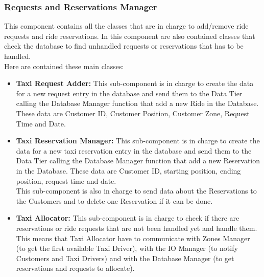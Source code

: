 \documentclass[../../../../../../../dd.tex]{subfiles}
\begin{document}
	\subsubsection{Requests and Reservations Manager}
		This component contains all the classes that are in charge to add/remove ride requests and ride reservations. In this component are also contained classes that check the database to find unhandled requests or reservations that has to be handled.
		\\
		Here are contained these main classes:
		\\
		\begin{itemize}
			\item \textbf{Taxi Request Adder:} This sub-component is in charge to create the data for a new request entry in the database and send them to the Data Tier calling the Database Manager function that add a new Ride in the Database.
			These data are Customer ID, Customer Position, Customer Zone, Request Time and Date.

			\item \textbf{Taxi Reservation Manager:} This sub-component is in charge to create the data for a new taxi reservation entry in the database and send them to the Data Tier calling the Database Manager function that add a new Reservation in the Database.
			These data are Customer ID, starting position, ending position, request time and date.
			\\This sub-component is also in charge to send data about the Reservations to the Customers and to delete one Reservation if it can be done.

			\item \textbf{Taxi Allocator:} This sub-component is in charge to check if there are reservations or ride requests that are not been handled yet and handle them.
			This means that Taxi Allocator have to communicate with Zones Manager (to get the first available Taxi Driver), with the IO Manager (to notify Customers and Taxi Drivers) and with the Database Manager (to get reservations and requests to allocate).

		\end{itemize}
\end{document}
